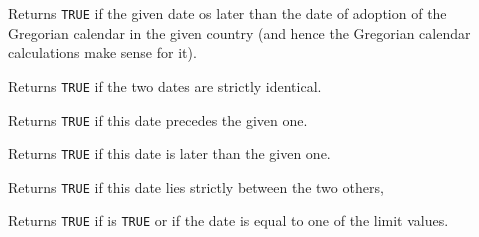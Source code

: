 \label{wxdatetimeisgregoriandate}


Returns {\tt TRUE} if the given date os later than the date of adoption of the
Gregorian calendar in the given country (and hence the Gregorian calendar
calculations make sense for it).


\label{wxdatetimeisequalto}


Returns {\tt TRUE} if the two dates are strictly identical.

\label{wxdatetimeisearlierthan}


Returns {\tt TRUE} if this date precedes the given one.

\label{wxdatetimeislaterthan}


Returns {\tt TRUE} if this date is later than the given one.

\label{wxdatetimeisstrictlybetween}


Returns {\tt TRUE} if this date lies strictly between the two others,



\label{wxdatetimeisbetween}


Returns {\tt TRUE} if 
is {\tt TRUE} or if the date is equal to one of the limit values.



